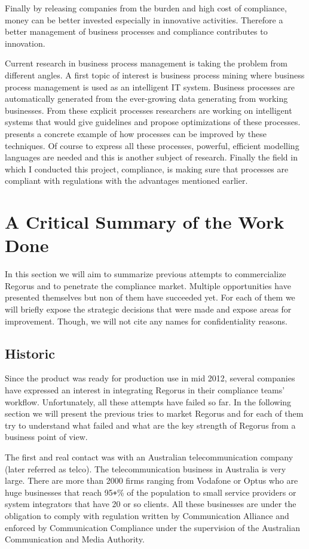 \documentclass[10pt]{report}
\begin{document}
Finally by releasing companies from the burden and high cost of compliance, money can be better invested especially in innovative activities. Therefore a better management of business processes and compliance contributes to innovation.

Current research in business process management is taking the problem from different angles. A first topic of interest is business process mining where business process management is used as an intelligent IT system. Business processes are automatically generated from the ever-growing data generating from working businesses. From these explicit processes researchers are working on intelligent systems that would give guidelines and propose optimizations of these processes. \autocite{keynoteBae} presents a concrete example of how processes can be improved by these techniques. Of course to express all these processes, powerful, efficient modelling languages are needed and this is another subject of research. Finally the field in which I conducted this project, compliance, is making sure that processes are compliant with regulations with the advantages mentioned earlier.


\section{A Critical Summary of the Work Done}
In this section we will aim to summarize previous attempts to commercialize Regorus and to penetrate the compliance market. Multiple opportunities have presented themselves but non of them have succeeded yet. For each of them we will briefly expose the strategic decisions that were made and expose areas for improvement. Though, we will not cite any names for confidentiality reasons.

\subsection{Historic}

Since the product was ready for production use in mid 2012, several companies have expressed an interest in integrating Regorus in their compliance teams' workflow. Unfortunately, all these attempts have failed so far. In the following section we will present the previous tries to market Regorus and for each of them try to understand what failed and what are the key strength of Regorus from a business point of view.

The first and real contact was with an Australian telecommunication company (later referred as telco). The telecommunication business in Australia is very large. There are more than 2000 firms ranging from Vodafone or Optus who are huge businesses that reach 95\texttt{+}\% of the population to small service providers or system integrators that have 20 or so clients. All these businesses are under the obligation to comply with regulation written by Communication Alliance and enforced by Communication Compliance under the supervision of the Australian Communication and Media Authority.
\end{document}
